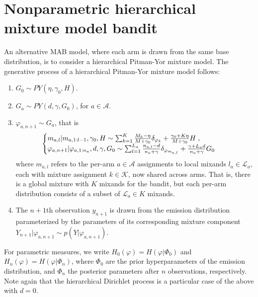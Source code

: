 \section{Nonparametric hierarchical mixture model bandit}
\label{asec:nonparametric_hierarchical_mixture_model}

An alternative MAB model, where each arm is drawn from the same base distribution, is to consider a hierarchical Pitman-Yor mixture model. The generative process of a hierarchical Pitman-Yor mixture model follows:

\begin{enumerate}
\item $G_0 \sim PY(\eta,\gamma_0, H)$.
\item $G_a \sim PY(d,\gamma,G_0)$, for $a \in \mathcal{A}$.
\item $\varphi_{a,n+1} \sim G_a$, that is
\begin{equation}
\hspace*{-2ex}
\begin{cases}
m_{a,l}|m_{a,1:l-1},\gamma_0, H \sim \sum_{k=1}^{K} \frac{M_{k}-\eta}{M+\gamma_0}\delta_{\varphi_k}+\frac{\gamma_0+K\eta}{M+\gamma_0}H \;, \\
\varphi_{a,n+1}|\varphi_{a,1:n_a}, d, \gamma, G_0 \sim \sum_{l=1}^{L_a} \frac{n_{a,l}-d}{n_a+\gamma}\delta_{\varphi_{m_{a,l}}}+\frac{\gamma+L_a d}{n_a+\gamma}G_0
\end{cases}
\end{equation}
where $m_{a,l}$ refers to the per-arm $a \in \mathcal{A}$ assignments to local mixands $l_a \in \mathcal{L}_a$, each with mixture assignment $k \in \mathcal{K}$, now shared across arms. That is, there is a global mixture with $K$ mixands for the bandit, but each per-arm distribution consists of a subset of $\mathcal{L}_a \in K$ mixands.
\item The $n+1$th observation $y_{n+1}$ is drawn from the emission distribution parameterized by the parameters of its corresponding mixture component $Y_{n+1}|\varphi_{a,n+1} \sim p(Y|\varphi_{a,n+1})$.
\end{enumerate}
For parametric measures, we write $H_0(\varphi)=H(\varphi|\varPhi_0)$ and $H_n(\varphi)=H(\varphi|\varPhi_n)$, where $\varPhi_0$ are the prior hyperparameters of the emission distribution, and $\varPhi_n$ the posterior parameters after $n$ observations, respectively.
Note again that the hierarchical Dirichlet process is a particular case of the above with $d=0$.

